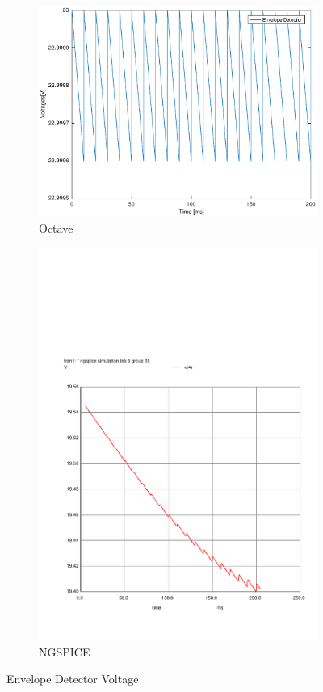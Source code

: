 \begin{figure}[H] 
\centering
\begin{subfigure}{0.4\textwidth}
\includegraphics[width=\textwidth]{EnvelopeDetector.eps}
\caption{Octave}
\label{fig:first}
\end{subfigure}
\begin{subfigure}{0.3\textwidth}
\includegraphics[width=\textwidth]{sim32.pdf}
\caption{NGSPICE}
\label{fig:second}
\end{subfigure}
\caption{Envelope Detector Voltage}
\end{figure}

